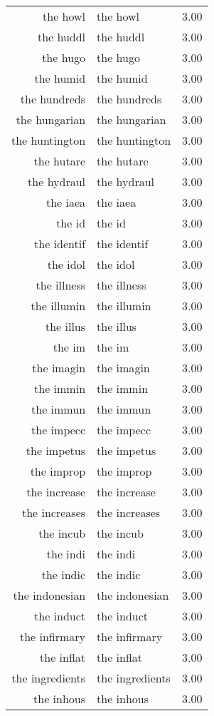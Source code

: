 \begin{table}[ht]
\begin{tabular}{rlr}
  the howl & the howl & 3.00 \\ 
  the huddl & the huddl & 3.00 \\ 
  the hugo & the hugo & 3.00 \\ 
  the humid & the humid & 3.00 \\ 
  the hundreds & the hundreds & 3.00 \\ 
  the hungarian & the hungarian & 3.00 \\ 
  the huntington & the huntington & 3.00 \\ 
  the hutare & the hutare & 3.00 \\ 
  the hydraul & the hydraul & 3.00 \\ 
  the iaea & the iaea & 3.00 \\ 
  the id & the id & 3.00 \\ 
  the identif & the identif & 3.00 \\ 
  the idol & the idol & 3.00 \\ 
  the illness & the illness & 3.00 \\ 
  the illumin & the illumin & 3.00 \\ 
  the illus & the illus & 3.00 \\ 
  the im & the im & 3.00 \\ 
  the imagin & the imagin & 3.00 \\ 
  the immin & the immin & 3.00 \\ 
  the immun & the immun & 3.00 \\ 
  the impecc & the impecc & 3.00 \\ 
  the impetus & the impetus & 3.00 \\ 
  the improp & the improp & 3.00 \\ 
  the increase & the increase & 3.00 \\ 
  the increases & the increases & 3.00 \\ 
  the incub & the incub & 3.00 \\ 
  the indi & the indi & 3.00 \\ 
  the indic & the indic & 3.00 \\ 
  the indonesian & the indonesian & 3.00 \\ 
  the induct & the induct & 3.00 \\ 
  the infirmary & the infirmary & 3.00 \\ 
  the inflat & the inflat & 3.00 \\ 
  the ingredients & the ingredients & 3.00 \\ 
  the inhous & the inhous & 3.00 \\ 

\end{tabular}
\end{table}
